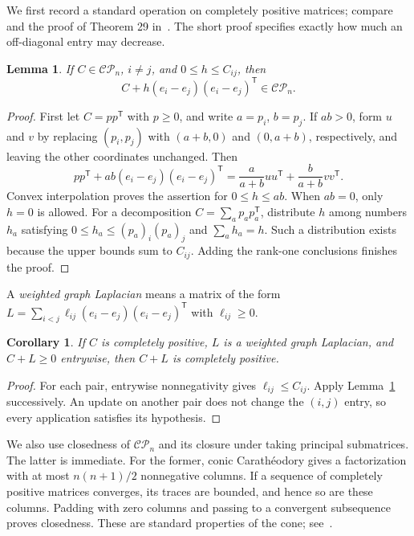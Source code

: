 \documentclass[11pt]{article}
\newtheorem{lemma}[theorem]{Lemma}
\newtheorem{corollary}[theorem]{Corollary}
\theoremstyle{remark}
\newcommand{\CP}{\mathcal{CP}}
\begin{document}
We first record a standard operation on completely positive matrices;
compare~\cite{SMB} and the proof of Theorem 29 in~\cite{CSZ}.
The short proof specifies exactly how much an off-diagonal entry may decrease.

\begin{lemma}\label{lem:pair}
If $C\in\CP_n$, $i\ne j$, and $0\le h\le C_{ij}$, then
\[
 C+h(e_i-e_j)(e_i-e_j)^{\mathsf T}\in\CP_n.
\]
\end{lemma}
\begin{proof}
First let $C=pp^{\mathsf T}$ with $p\ge0$, and write $a=p_i$, $b=p_j$.
If $ab>0$, form $u$ and $v$ by replacing $(p_i,p_j)$ with $(a+b,0)$ and
$(0,a+b)$, respectively, and leaving the other coordinates unchanged.
Then
\[
 pp^{\mathsf T}+ab(e_i-e_j)(e_i-e_j)^{\mathsf T}
 =\frac{a}{a+b}uu^{\mathsf T}+\frac{b}{a+b}vv^{\mathsf T}.
\]
Convex interpolation proves the assertion for $0\le h\le ab$.
When $ab=0$, only $h=0$ is allowed.
For a decomposition $C=\sum_a p_ap_a^{\mathsf T}$, distribute $h$ among
numbers $h_a$ satisfying $0\le h_a\le(p_a)_i(p_a)_j$ and $\sum_a h_a=h$.
Such a distribution exists because the upper bounds sum to $C_{ij}$.
Adding the rank-one conclusions finishes the proof.
\end{proof}

A \emph{weighted graph Laplacian} means a matrix of the form
$L=\sum_{i<j}\ell_{ij}(e_i-e_j)(e_i-e_j)^{\mathsf T}$ with $\ell_{ij}\ge0$.

\begin{corollary}\label{cor:laplacian}
If $C$ is completely positive, $L$ is a weighted graph Laplacian, and
$C+L\ge0$ entrywise, then $C+L$ is completely positive.
\end{corollary}
\begin{proof}
For each pair, entrywise nonnegativity gives $\ell_{ij}\le C_{ij}$.
Apply Lemma~\ref{lem:pair} successively. An update on another pair does not
change the $(i,j)$ entry, so every application satisfies its hypothesis.
\end{proof}

We also use closedness of $\CP_n$ and its closure under taking principal
submatrices. The latter is immediate. For the former, conic
Carath\'eodory gives a factorization with at most $n(n+1)/2$ nonnegative
columns. If a sequence of completely positive matrices converges, its traces
are bounded, and hence so are these columns. Padding with zero columns and
passing to a convergent subsequence proves closedness.
These are standard properties of the cone; see~\cite{SMB}.
\end{document}
